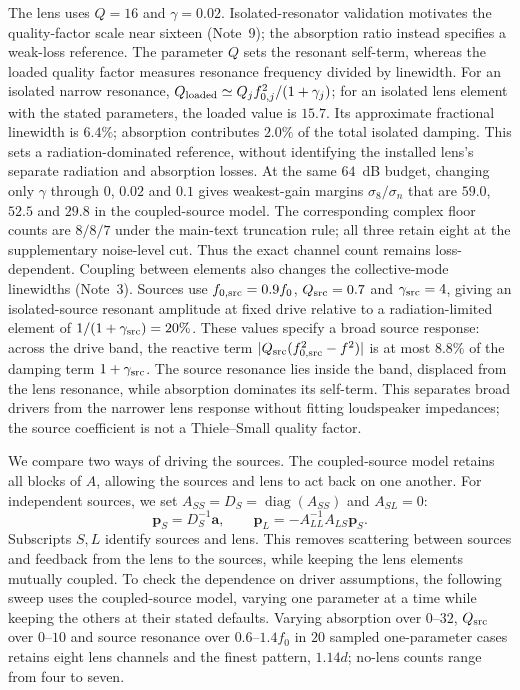 \documentclass[pdflatex,sn-nature]{sn-jnl}%
\begin{document}
The lens uses $Q=16$ and $\gamma=0.02$. Isolated-resonator validation motivates the quality-factor scale near sixteen (Note~9); the absorption ratio instead specifies a weak-loss reference. The parameter $Q$ sets the resonant self-term, whereas the loaded quality factor measures resonance frequency divided by linewidth. For an isolated narrow
resonance, $Q_{\rm loaded}\simeq Q_jf_{0,j}^2/(1+\gamma_j)$; for an isolated lens element with the stated parameters,
the loaded value is $15.7$. Its approximate fractional linewidth is $6.4\%$; absorption contributes $2.0\%$ of the total isolated damping. This sets a radiation-dominated reference, without identifying the installed lens's separate radiation and absorption losses. At the same $64$~dB budget, changing only $\gamma$ through $0$, $0.02$ and $0.1$ gives weakest-gain margins $\sigma_8/\sigma_n$ that are $59.0$, $52.5$ and $29.8$ in the coupled-source model. The corresponding complex floor counts are $8/8/7$ under the main-text truncation rule; all three retain eight at the supplementary noise-level cut. Thus the exact channel count remains loss-dependent. Coupling between elements also changes the collective-mode linewidths (Note~3). Sources use $f_{0,\rm src}=0.9f_0$,
$Q_{\rm src}=0.7$ and $\gamma_{\rm src}=4$, giving an isolated-source resonant amplitude at fixed drive
relative to a radiation-limited element of $1/(1+\gamma_{\rm src})=20\%$.
These values specify a broad source response: across the drive band, the reactive term $|Q_{\rm src}(f_{0,\rm src}^2-f^2)|$ is at most $8.8\%$ of the damping term $1+\gamma_{\rm src}$. The source resonance lies inside the band, displaced from the lens resonance, while absorption dominates its self-term. This separates broad drivers from the narrower lens response without fitting loudspeaker impedances; the source coefficient is not a Thiele--Small quality factor.

We compare two ways of driving the sources. The coupled-source model retains all blocks of $A$, allowing the sources and lens to act back on one another. For independent sources, we set $A_{SS}=D_S=\operatorname{diag}(A_{SS})$ and $A_{SL}=0$:
\begin{equation}
 \bm p_S=D_S^{-1}\bm a,\qquad
 \bm p_L=-A_{LL}^{-1}A_{LS}\bm p_S.
 \label{eq:decoupled}
\end{equation}
Subscripts $S,L$ identify sources and lens. This removes scattering between sources and feedback from the lens to the sources, while keeping the lens elements mutually coupled.
To check the dependence on driver assumptions, the following sweep uses the coupled-source model, varying one parameter at a time while keeping the others at their stated defaults. Varying absorption over $0$--$32$, $Q_{\rm src}$ over $0$--$10$ and source
resonance over $0.6$--$1.4f_0$ in $20$ sampled one-parameter cases retains eight lens channels and the finest
pattern, $1.14d$; no-lens counts range from four to seven.
\end{document}
